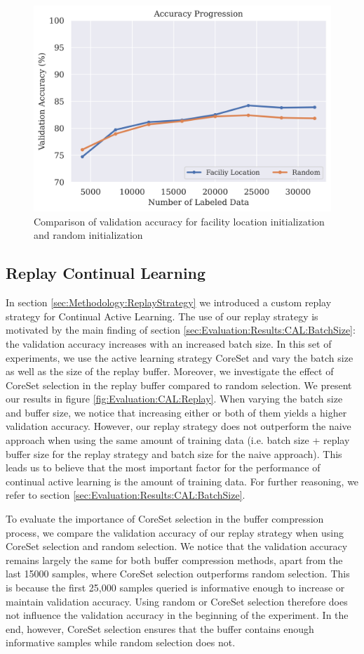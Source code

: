 \begin{figure}[h]
    \centering
    \includegraphics[width=0.7\linewidth]{images/results_CAL/Facility_location_init.png}
    \caption{Comparison of validation accuracy for facility location initialization and random initialization}
    \label{fig:Evaluation:Results:CAL:FLinit}
\end{figure}


\subsection{Replay Continual Learning}
\label{sec:Evaluation:Results:CAL:Replay}
In section \ref{sec:Methodology:ReplayStrategy} we introduced a custom replay strategy for Continual Active Learning. The use of our replay strategy is motivated by the main
finding of section \ref{sec:Evaluation:Results:CAL:BatchSize}: the validation accuracy increases with an increased batch size. In this set of experiments, we use the active
learning strategy CoreSet and vary the batch size as well as the size of the replay buffer. Moreover, we investigate the effect of CoreSet selection in the replay buffer
compared to random selection. We present our results in figure \ref{fig:Evaluation:CAL:Replay}. When varying the batch size and buffer size, we notice that increasing either
or both of them yields a higher validation accuracy. However, our replay strategy does not outperform the naive approach when using the same amount of training data
(i.e. batch size + replay buffer size for the replay strategy and batch size for the naive approach). This leads us to believe that the most important factor for the performance
of continual active learning is the amount of training data. For further reasoning, we refer to section \ref{sec:Evaluation:Results:CAL:BatchSize}. \par
To evaluate the importance of CoreSet selection in the buffer compression process, we compare the validation accuracy of our replay strategy when using CoreSet selection and
random selection. We notice that the validation accuracy remains largely the same for both buffer compression methods, apart from the last 15000 samples, where CoreSet selection
outperforms random selection. This is because the first 25,000 samples queried is informative enough to increase or maintain validation accuracy. Using random or CoreSet selection
therefore does not influence the validation accuracy in the beginning of the experiment. In the end, however, CoreSet selection ensures that the buffer contains enough
informative samples while random selection does not.  \par


